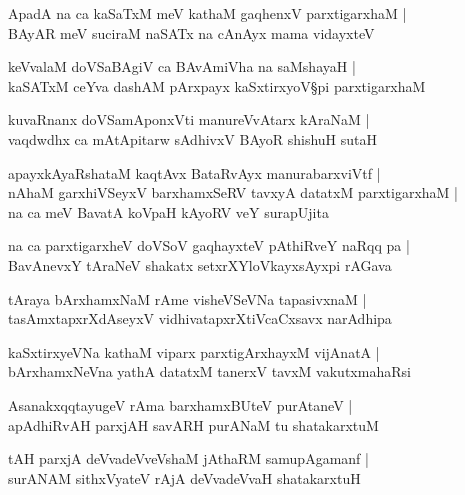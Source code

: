 \begin{shloka}
ApadA na ca kaSaTxM meV kathaM gaqhenxV parxtigarxhaM |\\
BAyAR meV suciraM naSATx na cAnAyx mama vidayxteV 
\end{shloka}

\begin{shloka}
keVvalaM doVSaBAgiV ca BAvAmiVha na saMshayaH |\\
kaSATxM ceYva dashAM pArxpayx kaSxtirxyoV\S pi parxtigarxhaM 
\end{shloka}

\begin{shloka}
kuvaRnanx doVSamAponxVti manureVvAtarx kAraNaM |\\
vaqdwdhx ca mAtApitarw sAdhivxV BAyoR shishuH sutaH
\end{shloka}

\begin{shloka}
apayxkAyaRshataM kaqtAvx BataRvAyx manurabarxviVtf |\\
nAhaM garxhiVSeyxV barxhamxSeRV tavxyA datatxM parxtigarxhaM |\\
na ca meV BavatA koVpaH kAyoRV veY surapUjita
\end{shloka}

\begin{shloka}
na ca parxtigarxheV doVSoV gaqhayxteV pAthiRveY naRqq pa |\\
BavAnevxY tAraNeV shakatx setxrXYloVkayxsAyxpi rAGava 
\end{shloka}

\begin{shloka}
tAraya bArxhamxNaM rAme visheVSeVNa tapasivxnaM |\\
tasAmxtapxrXdAseyxV vidhivatapxrXtiVcaCxsavx narAdhipa
\end{shloka}

\begin{shloka}
kaSxtirxyeVNa kathaM viparx parxtigArxhayxM vijAnatA |\\
bArxhamxNeVna yathA datatxM tanerxV tavxM vakutxmahaRsi 
\end{shloka}

\begin{shloka}
AsanakxqqtayugeV rAma barxhamxBUteV purAtaneV |\\
apAdhiRvAH parxjAH savARH purANaM tu shatakarxtuM 
\end{shloka}

\begin{shloka}
tAH parxjA deVvadeVveVshaM jAthaRM samupAgamanf |\\
surANAM sithxVyateV rAjA deVvadeVvaH shatakarxtuH
\end{shloka}

